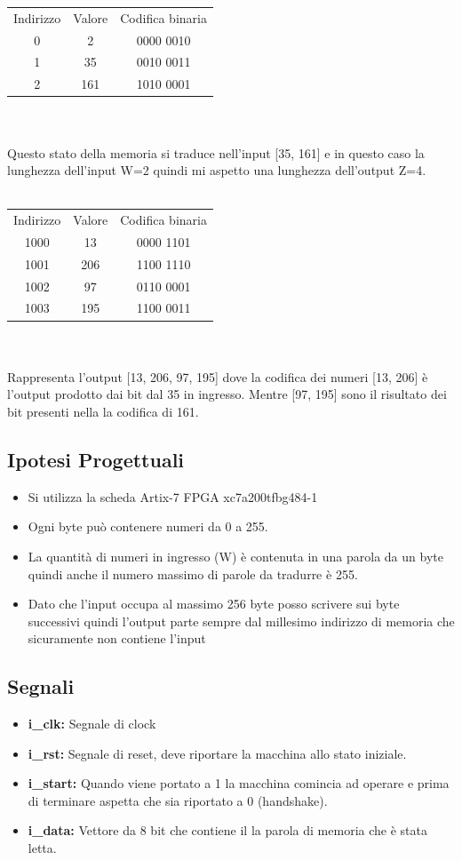 \documentclass{article}
\begin{document}
\begin{tabular}{c c c}
	Indirizzo & Valore & Codifica binaria \\
	0 & 2 & 0000 0010 \\
	1 & 35 & 0010 0011 \\
	2 & 161 & 1010 0001 \\
\end{tabular}
\\
\\
Questo stato della memoria si traduce nell'input [35, 161] e in questo caso la lunghezza dell'input W=2 quindi mi aspetto una lunghezza dell'output Z=4.
\\
\\
\begin{tabular}{c c c}
	Indirizzo & Valore & Codifica binaria \\
	1000 & 13 & 0000 1101 \\
	1001 & 206 & 1100 1110 \\
	1002 & 97 & 0110 0001 \\
	1003 & 195 & 1100 0011 \\
\end{tabular}
\\
\\
Rappresenta l'output [13, 206, 97, 195] dove la codifica dei numeri [13, 206] è l'output prodotto dai bit dal 35 in ingresso. Mentre [97, 195] sono il risultato dei bit presenti nella la codifica di 161.

\subsection{Ipotesi Progettuali}
\begin{itemize}
\item {Si utilizza la scheda Artix-7 FPGA xc7a200tfbg484-1}
\item {Ogni byte può contenere numeri da 0 a 255.}
\item {La quantità di numeri in ingresso (W) è contenuta in una parola da un byte quindi anche il numero massimo di parole da tradurre è 255.}
\item {Dato che l'input occupa al massimo 256 byte posso scrivere sui byte successivi quindi l'output parte sempre dal millesimo indirizzo di memoria che sicuramente non contiene l'input}
\end{itemize}

\subsection{Segnali}
\begin{itemize}
	\item \textbf{i\_clk:} Segnale di clock
	\item \textbf{i\_rst:} Segnale di reset, deve riportare la macchina allo stato iniziale.
	\item \textbf{i\_start:} Quando viene portato a 1 la macchina comincia ad operare e prima di terminare aspetta che sia riportato a 0 (handshake).
	\item \textbf{i\_data:} Vettore da 8 bit che contiene il la parola di memoria che è stata letta.
\end{itemize}
\end{document}
